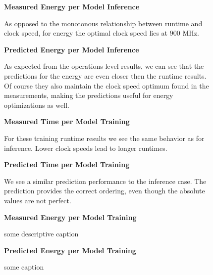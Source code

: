\begin{figure}[htbp]
    \centering
    \parbox{1.1\textwidth}{\centering\textbf{Measured Energy per Model Inference}}
    \caption{As opposed to the monotonous relationship between runtime and clock speed, for energy the optimal clock speed lies at $900$ MHz.}
    \label{fig:grpfmenergyinf}
    \vspace{0.2cm}
    \parbox{1.1\textwidth}{\centering\textbf{Predicted Energy per Model Inference}}
    \caption{As expected from the operations level results, we can see that the predictions for the energy are even closer then the runtime results. Of course they also maintain the clock speed optimum found in the measurements, making the predictions useful for energy optimizations as well.}
    \label{fig:fprpredenergyinf}
\end{figure}


\begin{figure}[htbp]
    \centering
    \parbox{1.1\textwidth}{\centering\textbf{Measured Time per Model Training}}
    \caption{For these training runtime results we see the same behavior as for inference. Lower clock speeds lead to longer runtimes.}
    \label{fig:grpfmtimetrain}
    \vspace{0.2cm}
    \parbox{1.1\textwidth}{\centering\textbf{Predicted Time per Model Training}}
    \caption{We see a similar prediction performance to the inference case. The prediction provides the correct ordering, even though the absolute values are not perfect.}
    \label{fig:grppredtimetrain}
\end{figure}


\begin{figure}[htbp]
    \centering
    \parbox{1.1\textwidth}{\centering\textbf{Measured Energy per Model Training}}
    \caption{some descriptive caption}
    \label{fig:grpfmenergytrain}
    \vspace{0.2cm}
    \parbox{1.1\textwidth}{\centering\textbf{Predicted Energy per Model Training}}
    \caption{some caption}
    \label{fig:grppredenergytrain}
\end{figure}



